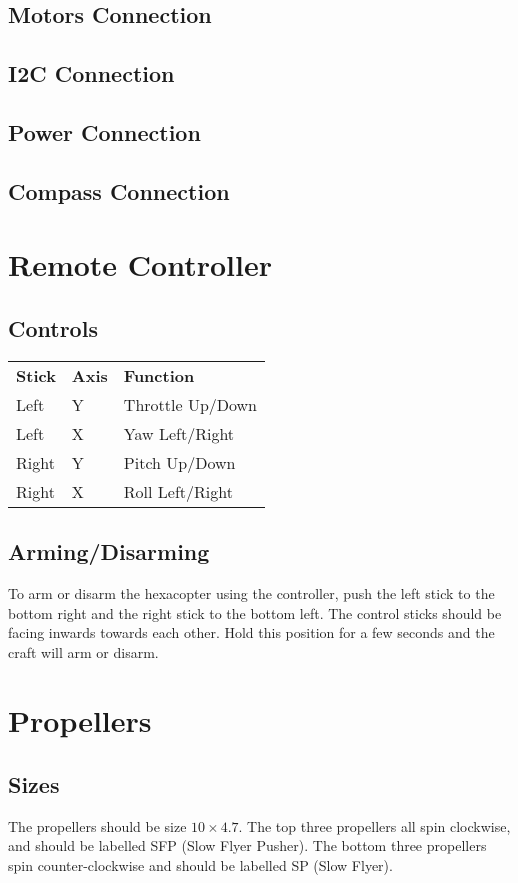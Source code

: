 \documentclass{style}
\begin{document}
\subsection{Motors Connection}
\subsection{I2C Connection}
\subsection{Power Connection}
\subsection{Compass Connection}
\section{Remote Controller}
\subsection{Controls}
\begin{tabular}{ l l l }
  \textbf{Stick} & \textbf{Axis} & \textbf{Function} \\
  Left & Y & Throttle Up/Down \\
  Left & X & Yaw Left/Right \\
  Right & Y & Pitch Up/Down \\
  Right & X & Roll Left/Right
\end{tabular}
\subsection{Arming/Disarming}
To arm or disarm the hexacopter using the controller, push the left stick to the bottom right and the right stick to the bottom left.  The control sticks should be facing inwards towards each other.  Hold this position for a few seconds and the craft will arm or disarm.
\section{Propellers}
\subsection{Sizes}
The propellers should be size $10\times4.7$.  The top three propellers all spin clockwise, and should be labelled SFP (Slow Flyer Pusher).  The bottom three propellers spin counter-clockwise and should be labelled SP (Slow Flyer).
\end{document}
